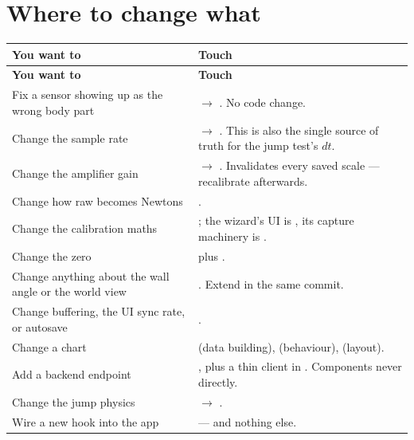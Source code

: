 \documentclass[11pt,a4paper]{article}
\begin{document}
\section{Where to change what}

\begin{longtable}{@{}L{5.6cm}L{9.6cm}@{}}
\toprule
\textbf{You want to} & \textbf{Touch} \\
\midrule
\endfirsthead
\toprule
\textbf{You want to} & \textbf{Touch} \\
\midrule
\endhead
Fix a sensor showing up as the wrong body part &
   $\rightarrow$ . No code change. \\
Change the sample rate &
   $\rightarrow$ . This is also
  the single source of truth for the jump test's $dt$. \\
Change the amplifier gain &
   $\rightarrow$ . Invalidates every
  saved scale --- recalibrate afterwards. \\
Change how raw becomes Newtons &
  . \\
Change the calibration maths &
  ; the wizard's UI is
  , its capture machinery is
  . \\
Change the zero &
   plus . \\
Change anything about the wall angle or the world view &
  . Extend  in the
  same commit. \\
Change buffering, the UI sync rate, or autosave &
  . \\
Change a chart &
   (data building), 
  (behaviour),  (layout). \\
Add a backend endpoint &
  , plus a thin client in .
  Components never  directly. \\
Change the jump physics &
   $\rightarrow$ . \\
Wire a new hook into the app &
   --- and nothing else. \\
\bottomrule
\end{longtable}
\end{document}
